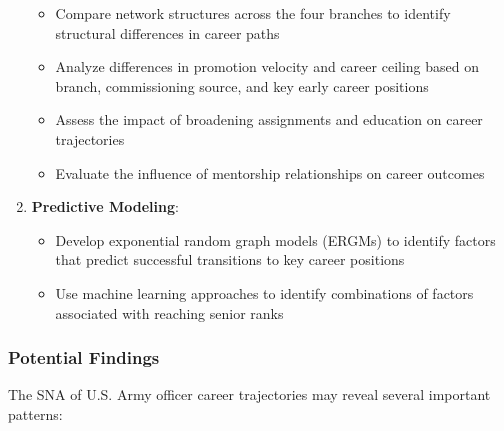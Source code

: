 \documentclass[
  letterpaper,
  DIV=11,
  numbers=noendperiod]{scrartcl}
\providecommand{\tightlist}{%
  \setlength{\itemsep}{0pt}\setlength{\parskip}{0pt}}
\begin{document}
\begin{enumerate}
  \begin{itemize}
  \tightlist
  \item
    Compare network structures across the four branches to identify
    structural differences in career paths
  \item
    Analyze differences in promotion velocity and career ceiling based
    on branch, commissioning source, and key early career positions
  \item
    Assess the impact of broadening assignments and education on career
    trajectories
  \item
    Evaluate the influence of mentorship relationships on career
    outcomes
  \end{itemize}
\item
  \textbf{Predictive Modeling}:

  \begin{itemize}
  \tightlist
  \item
    Develop exponential random graph models (ERGMs) to identify factors
    that predict successful transitions to key career positions
  \item
    Use machine learning approaches to identify combinations of factors
    associated with reaching senior ranks
  \end{itemize}
\end{enumerate}

\subsubsection{Potential Findings}\label{potential-findings}

The SNA of U.S. Army officer career trajectories may reveal several
important patterns:
\end{document}
